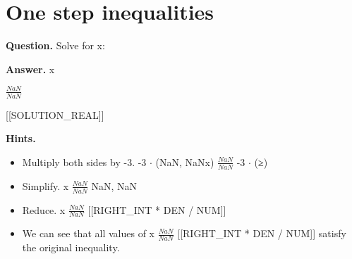 \documentclass{article}
\begin{document}
\section*{One step inequalities}
\textbf{Question.} Solve for x:

\textbf{Answer.} x
                    
                        $\frac{NaN}{NaN}$
                    
                    [[SOLUTION\_REAL]]

\textbf{Hints.}
\begin{itemize}
  \item Multiply both sides by -3.
                        -3 $\cdot$ (NaN, NaNx) $\frac{NaN}{NaN}$ -3 $\cdot$ (≥)
  \item Simplify.
                        x $\frac{NaN}{NaN}$ NaN, NaN
  \item Reduce.
                        x $\frac{NaN}{NaN}$ [[RIGHT\_INT * DEN / NUM]]
  \item We can see that all values of x $\frac{NaN}{NaN}$ [[RIGHT\_INT * DEN / NUM]] satisfy the original inequality.
\end{itemize}
\end{document}
